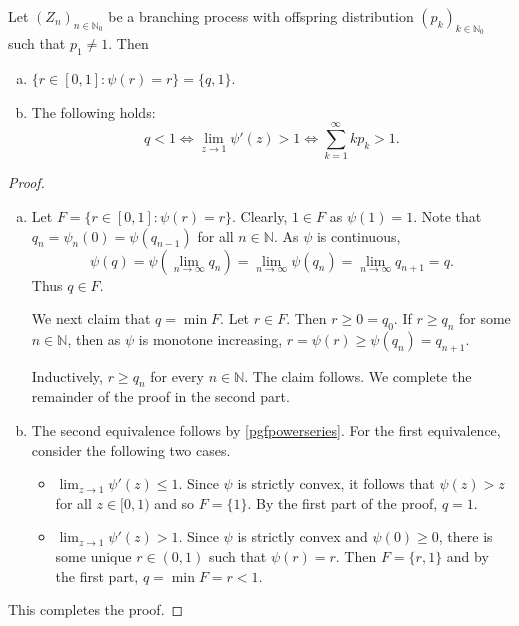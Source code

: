 \begin{theorem}
    Let $(Z_n)_{n\in\mathbb{N}_0}$ be a branching process with offspring distribution $(p_k)_{k\in\mathbb{N}_0}$ such that $p_1\neq 1$. Then
    \begin{enumerate}[(a)]
        \item $\{r\in[0,1]:\psi(r)=r\}=\{q,1\}$.
        \item The following holds:
        $$q<1\iff \lim_{z\to 1}\psi'(z)>1\iff \sum_{k=1}^\infty kp_k>1.$$
    \end{enumerate}
\end{theorem}
\begin{proof}
    ~
    \begin{enumerate}[(a)]
        \item Let $F=\{r\in[0,1]:\psi(r)=r\}$.
        Clearly, $1\in F$ as $\psi(1)=1$. Note that $q_n=\psi_n(0)=\psi(q_{n-1})$ for all $n\in\mathbb{N}$. As $\psi$ is continuous,
        $$\psi(q)=\psi\left(\lim_{n\to\infty} q_n\right)=\lim_{n\to\infty}\psi(q_n)=\lim_{n\to\infty} q_{n+1}=q.$$
        Thus $q\in F$.
        
        We next claim that $q=\min F$. Let $r\in F$. Then $r\geq 0= q_0$. If $r\geq q_n$ for some $n\in\mathbb{N}$, then as $\psi$ is monotone increasing, $r=\psi(r)\geq\psi(q_n)=q_{n+1}$.
        
        Inductively, $r\geq q_n$ for every $n\in\mathbb{N}$. The claim follows. We complete the remainder of the proof in the second part.
        
        \item The second equivalence follows by \cref{pgfpowerseries}. For the first equivalence, consider the following two cases.
        \begin{itemize}
            \item $\lim_{z\to 1}\psi'(z)\leq 1$. Since $\psi$ is strictly convex, it follows that $\psi(z)>z$ for all $z\in[0,1)$ and so $F=\{1\}$. By the first part of the proof, $q=1$.
            
            \item $\lim_{z\to 1}\psi'(z)> 1$. Since $\psi$ is strictly convex and $\psi(0)\geq 0$, there is some unique $r\in(0,1)$ such that $\psi(r)=r$. Then $F=\{r,1\}$ and by the first part, $q=\min F=r<1$.
        \end{itemize}
    \end{enumerate}
    This completes the proof.
\end{proof}

\clearpage